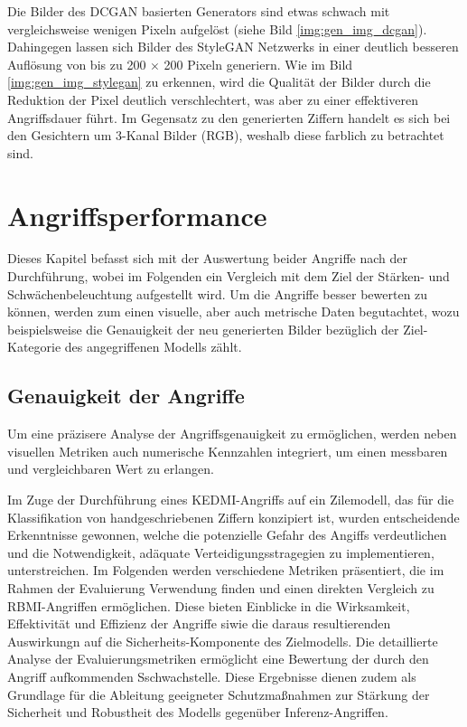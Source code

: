 Die Bilder des DCGAN basierten Generators sind etwas schwach mit vergleichsweise wenigen Pixeln aufgelöst (siehe Bild \ref{img:gen_img_dcgan}). Dahingegen lassen sich Bilder des StyleGAN Netzwerks in einer deutlich besseren Auflösung von bis zu 200 $\times$ 200 Pixeln generiern. Wie im Bild \ref{img:gen_img_stylegan} zu erkennen, wird die Qualität der Bilder durch die Reduktion der Pixel deutlich verschlechtert, was aber zu einer effektiveren Angriffsdauer führt. Im Gegensatz zu den generierten Ziffern handelt es sich bei den Gesichtern um 3-Kanal Bilder (RGB), weshalb diese farblich zu betrachtet sind.
\section{Angriffsperformance}
Dieses Kapitel befasst sich mit der Auswertung beider Angriffe nach der Durchführung, wobei im Folgenden ein Vergleich mit dem Ziel der Stärken- und Schwächenbeleuchtung aufgestellt wird. Um die Angriffe besser bewerten zu können, werden zum einen visuelle, aber auch metrische Daten begutachtet, wozu beispielsweise die Genauigkeit der neu generierten Bilder bezüglich der Ziel-Kategorie des \glqq angegriffenen\grqq{} Modells zählt.
\subsection{Genauigkeit der Angriffe}
Um eine präzisere Analyse der Angriffsgenauigkeit zu ermöglichen, werden neben visuellen Metriken auch numerische Kennzahlen integriert, um einen messbaren und vergleichbaren Wert zu erlangen.

Im Zuge der Durchführung eines \glqq KEDMI\grqq-Angriffs auf ein Zilemodell, das für die Klassifikation von handgeschriebenen Ziffern konzipiert ist, wurden entscheidende Erkenntnisse gewonnen, welche die potenzielle Gefahr des Angiffs verdeutlichen und die Notwendigkeit, adäquate Verteidigungsstragegien zu implementieren, unterstreichen. Im Folgenden werden verschiedene Metriken präsentiert, die im Rahmen der Evaluierung Verwendung finden und einen direkten Vergleich zu \glqq RBMI\grqq-Angriffen ermöglichen. Diese bieten Einblicke in die Wirksamkeit, Effektivität und Effizienz der Angriffe siwie die daraus resultierenden Auswirkungn auf die Sicherheits-Komponente des Zielmodells. Die detaillierte Analyse der Evaluierungsmetriken ermöglicht eine Bewertung der durch den Angriff aufkommenden Sschwachstelle. Diese Ergebnisse dienen zudem als Grundlage für die Ableitung geeigneter Schutzmaßnahmen zur Stärkung der Sicherheit und Robustheit des Modells gegenüber Inferenz-Angriffen.

